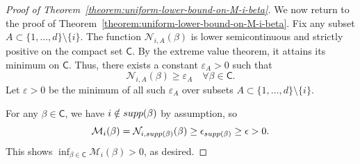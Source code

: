 \documentclass[10pt,a4paper]{amsart}
\newtheorem{theorem}{Theorem}
\newtheorem{lemma}{Lemma}
\newcommand{\E}{\mathbb{E}}
\newcommand{\R}{\mathbb{R}}
\newcommand{\eps}{\epsilon}
\newcommand{\norm}[1]{\left\|{#1}\right\|} %
\newcommand{\profile}{\psi}
\newcommand{\supp}{\mathop{\rm supp}}
\begin{document}
\begin{proof}[Proof of Theorem~\ref{theorem:uniform-lower-bound-on-M-i-beta}]

We now return to the proof of Theorem~\ref{theorem:uniform-lower-bound-on-M-i-beta}. Fix any subset 
$A \subset \{1, \dots, d\} \setminus \{i\}$.  The function $\mathcal{N}_{i, A}(\beta)$ is lower semicontinuous 
and  strictly positive on the compact set $\mathsf{C}$. By the extreme value theorem, it attains its minimum
on $\mathsf{C}$. Thus, there exists a constant $\varepsilon_A > 0$ such that
\[
\mathcal{N}_{i, A}(\beta) \ge \varepsilon_A \quad \forall \beta \in \mathsf{C}.
\]
Let $\varepsilon > 0$ be the minimum of all such $\varepsilon_A$ over subsets $A \subset \{1, \dots, d\} \setminus \{i\}$. 

For any $\beta \in \mathsf{C}$, we have $i \notin \supp(\beta)$ by assumption, so
\begin{equation*}
	\mathcal{M}_i(\beta) = \mathcal{N}_{i, \supp(\beta)}(\beta) \ge \eps_{\supp(\beta)} \ge \eps > 0.
\end{equation*}
This shows $\inf_{\beta \in \mathsf{C}} \mathcal{M}_i(\beta)  > 0$, as desired.
%
%
%


\end{proof}
\end{document}
